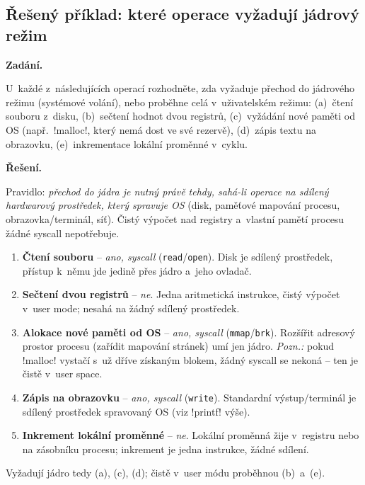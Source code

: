 \subsection{Řešený příklad: které operace vyžadují jádrový režim}

\begin{priklad}
\textbf{Zadání.}\par
U~každé z~následujících operací rozhodněte, zda vyžaduje přechod do jádrového režimu (systémové volání), nebo proběhne celá v~uživatelském režimu:
(a)~čtení souboru z~disku, (b)~sečtení hodnot dvou registrů, (c)~vyžádání nové paměti od OS (např.\ \cd!malloc!, který nemá dost ve své rezervě), (d)~zápis textu na obrazovku, (e)~inkrementace lokální proměnné v~cyklu.

\medskip
\textbf{Řešení.}\par
Pravidlo: \emph{přechod do jádra je nutný právě tehdy, sahá-li operace na sdílený hardwarový prostředek, který spravuje OS} (disk, paměťové mapování procesu, obrazovka/terminál, síť). Čistý výpočet nad registry a~vlastní pamětí procesu žádné syscall nepotřebuje.
\begin{enumerate}
\item[(a)] \textbf{Čtení souboru} -- \emph{ano, syscall} (\texttt{read}/\texttt{open}). Disk je sdílený prostředek, přístup k~němu jde jedině přes jádro a~jeho ovladač.
\item[(b)] \textbf{Sečtení dvou registrů} -- \emph{ne}. Jedna aritmetická instrukce, čistý výpočet v~user mode; nesahá na žádný sdílený prostředek.
\item[(c)] \textbf{Alokace nové paměti od OS} -- \emph{ano, syscall} (\texttt{mmap}/\texttt{brk}). Rozšířit adresový prostor procesu (zařídit mapování stránek) umí jen jádro. \emph{Pozn.:} pokud \cd!malloc! vystačí s~už dříve získaným blokem, žádný syscall se nekoná -- ten je čistě v~user space.
\item[(d)] \textbf{Zápis na obrazovku} -- \emph{ano, syscall} (\texttt{write}). Standardní výstup/terminál je sdílený prostředek spravovaný OS (viz \cd!printf! výše).
\item[(e)] \textbf{Inkrement lokální proměnné} -- \emph{ne}. Lokální proměnná žije v~registru nebo na zásobníku procesu; inkrement je jedna instrukce, žádné sdílení.
\end{enumerate}
Vyžadují jádro tedy (a), (c), (d); čistě v~user módu proběhnou (b)~a~(e).
\end{priklad}
